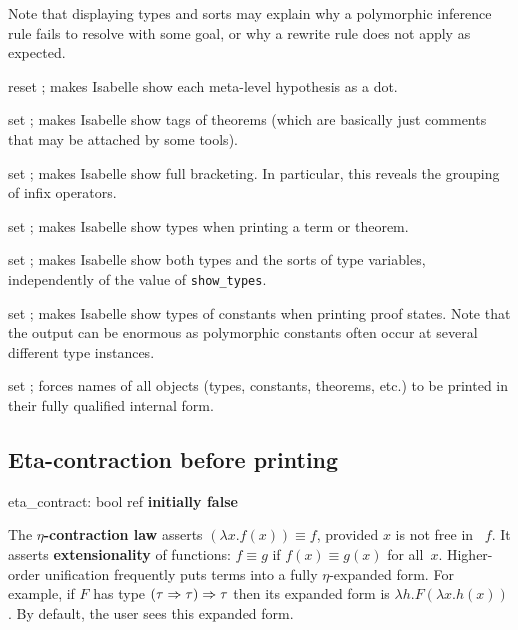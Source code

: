Note that displaying types and sorts may explain why a polymorphic
inference rule fails to resolve with some goal, or why a rewrite rule
does not apply as expected.

\begin{ttdescription}

\item[reset \ttindexbold{show_hyps};] makes Isabelle show each
  meta-level hypothesis as a dot.
  
\item[set \ttindexbold{show_tags};] makes Isabelle show tags of theorems
  (which are basically just comments that may be attached by some tools).
  
\item[set \ttindexbold{show_brackets};] makes Isabelle show full
  bracketing.  In particular, this reveals the grouping of infix
  operators.
  
\item[set \ttindexbold{show_types};] makes Isabelle show types when
  printing a term or theorem.
  
\item[set \ttindexbold{show_sorts};] makes Isabelle show both types
  and the sorts of type variables, independently of the value of
  \texttt{show_types}.
  
\item[set \ttindexbold{show_consts};] makes Isabelle show types of constants
  when printing proof states.  Note that the output can be enormous as
  polymorphic constants often occur at several different type instances.

\item[set \ttindexbold{long_names};] forces names of all objects
  (types, constants, theorems, etc.) to be printed in their fully
  qualified internal form.

\end{ttdescription}


\subsection{Eta-contraction before printing}
\begin{ttbox} 
eta_contract: bool ref \hfill{\bf initially false}
\end{ttbox}
The {\bf $\eta$-contraction law} asserts $(\lambda x.f(x))\equiv f$,
provided $x$ is not free in ~$f$.  It asserts {\bf extensionality} of
functions: $f\equiv g$ if $f(x)\equiv g(x)$ for all~$x$.  Higher-order
unification frequently puts terms into a fully $\eta$-expanded form.  For
example, if $F$ has type $(\tau\Rightarrow\tau)\Rightarrow\tau$ then its expanded form is
$\lambda h.F(\lambda x.h(x))$.  By default, the user sees this expanded
form.

